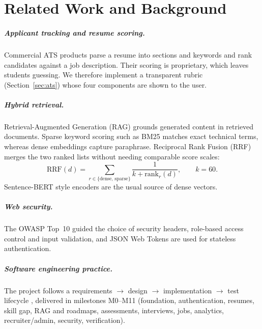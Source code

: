 \documentclass[openany]{tietreport}
\begin{document}
\chapter{Related Work and Background}

\paragraph{Applicant tracking and resume scoring.} Commercial ATS products parse a resume into sections and keywords and rank candidates against a job description. Their scoring is proprietary, which leaves students guessing. We therefore implement a transparent rubric (Section~\ref{sec:ats}) whose four components are shown to the user.

\paragraph{Hybrid retrieval.} Retrieval-Augmented Generation (RAG) \cite{lewis2020rag} grounds generated content in retrieved documents. Sparse keyword scoring such as BM25 \cite{robertson2009bm25} matches exact technical terms, whereas dense embeddings capture paraphrase. Reciprocal Rank Fusion (RRF) \cite{cormack2009rrf} merges the two ranked lists without needing comparable score scales:
\begin{equation}
  \mathrm{RRF}(d) = \sum_{r \in \{\text{dense},\,\text{sparse}\}} \frac{1}{k + \mathrm{rank}_r(d)}, \qquad k = 60.
\end{equation}
Sentence-BERT style encoders \cite{reimers2019sbert} are the usual source of dense vectors.

\paragraph{Web security.} The OWASP Top~10 \cite{owasp} guided the choice of security headers, role-based access control and input validation, and JSON Web Tokens \cite{rfc7519} are used for stateless authentication.

\paragraph{Software engineering practice.} The project follows a requirements $\rightarrow$ design $\rightarrow$ implementation $\rightarrow$ test lifecycle \cite{sommerville2016,pressman2020}, delivered in milestones M0--M11 (foundation, authentication, resumes, skill gap, RAG and roadmaps, assessments, interviews, jobs, analytics, recruiter/admin, security, verification).
\end{document}
